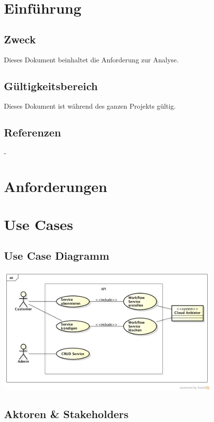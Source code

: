 \documentclass[11pt]{scrartcl}
\begin{document}
\newpage
\tableofcontents
\newpage

\section{Einführung}
\subsection{Zweck}
Dieses Dokument beinhaltet die Anforderung zur Analyse.
\subsection{Gültigkeitsbereich}
Dieses Dokument ist während des ganzen Projekts gültig.


\subsection{Referenzen}
-

\section{Anforderungen}


\section{Use Cases}
\subsection{Use Case Diagramm}
\includegraphics[width=0.84\textwidth]{UseCase-Diagramm}
\subsection{Aktoren \& Stakeholders}
\end{document}
